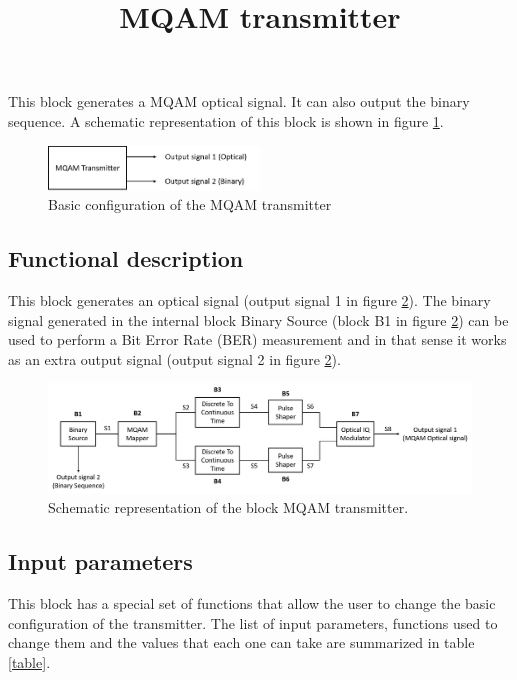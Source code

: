 \documentclass[a4paper]{article}
\title{MQAM transmitter}
\begin{document}
\maketitle
This block generates a MQAM optical signal. It can also output the binary sequence. A schematic representation of this block is shown in figure \ref{MQAM_transmitter_block_diagram_simple}.

\begin{figure}[h]
	\centering
	\includegraphics[width=0.5\textwidth]{MQAM_transmitter_block_diagram_simple}
	\caption{Basic configuration of the MQAM transmitter}\label{MQAM_transmitter_block_diagram_simple}
\end{figure}

\subsection*{Functional description}

This block generates an optical signal (output signal 1 in figure \ref{MQAM_transmitter_block_diagram}). The binary signal generated in the internal block Binary Source (block B1 in figure \ref{MQAM_transmitter_block_diagram}) can be used to perform a Bit Error Rate (BER) measurement and in that sense it works as an extra output signal (output signal 2 in figure \ref{MQAM_transmitter_block_diagram}).

\begin{figure}[h]
	\centering
	\includegraphics[width=\textwidth]{MQAM_transmitter_block_diagram}
	\caption{Schematic representation of the block MQAM transmitter.}\label{MQAM_transmitter_block_diagram}
\end{figure}

\subsection*{Input parameters}

This block has a special set of functions that allow the user to change the basic configuration of the transmitter. The list of input parameters, functions used to change them and the values that each one can take are summarized in table \ref{table}.
\end{document}
